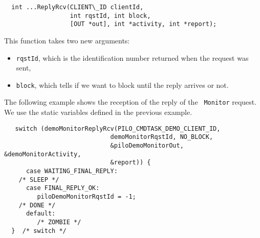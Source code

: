 \begin{center}\begin{cartouche}\small\begin{verbatim}
  int ...ReplyRcv(CLIENT\_ID clientId,
                  int rqstId, int block,
                  [OUT *out], int *activity, int *report);
\end{verbatim}\end{cartouche}\end{center}

This function takes two new arguments:
\begin{itemize}
\item {\tt rqstId}, which is the identification number returned when the
request was sent,

\item {\tt block}, which tells if we want to block until the
reply arrives or not.
\end{itemize}

The  following  example shows the  reception   of the  reply of  the {\tt
Monitor}  request.  We   use the static
variables defined in the previous example.


\begin{center}\begin{cartouche}\small\begin{verbatim}
   switch (demoMonitorReplyRcv(PILO_CMDTASK_DEMO_CLIENT_ID, 
                             demoMonitorRqstId, NO_BLOCK,
                             &piloDemoMonitorOut, &demoMonitorActivity, 
                             &report)) {
      case WAITING_FINAL_REPLY:
	/* SLEEP */
      case FINAL_REPLY_OK:
         piloDemoMonitorRqstId = -1;
	/* DONE */
      default:
         /* ZOMBIE */
  }  /* switch */
\end{verbatim}\end{cartouche}\end{center}


